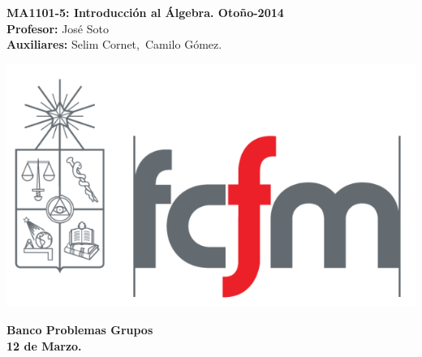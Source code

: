 \documentclass[11pt]{article}
\theoremstyle{plain}
\theoremstyle{definition}
\newcommand{\dos}{Camilo G\'omez}
\newcommand{\uno}{Selim Cornet}
\newcommand{\fecha}{12 de Marzo}
\begin{document}
\vspace*{-1.2 cm}
\begin{minipage}{0.6\textwidth}
\begin{flushleft}
\hspace*{-0.5cm}\textbf{MA1101-5: Introducci\'on al \'Algebra. Otoño-2014}\\
\hspace*{-0.5cm}\textbf{Profesor:} Jos\'e Soto\\
\hspace*{-0.5cm}\textbf{Auxiliares:} \uno,~\dos.\\
\end{flushleft}
\end{minipage}
\begin{minipage}{0.36\textwidth}
\begin{flushright}
\includegraphics[scale=0.15]{img/fcfm2.png}
\end{flushright}
\end{minipage}
\bigskip

\begin{center}
\LARGE\textbf{Banco Problemas Grupos}\\
\textbf{ \fecha.}
\end{center}
\end{document}
